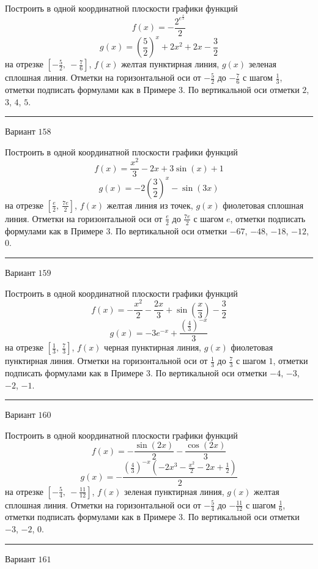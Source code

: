 \documentclass[11pt]{report}
\begin{document}
Построить в одной координатной плоскости графики функций $$f(x) = - \frac{2^{e^{\frac{x}{2}}}}{2}$$ $$g(x) = \left(\frac{5}{2}\right)^{x} + 2 x^{2} + 2 x - \frac{3}{2}$$ на отрезке $\left[- \frac{5}{2}, \  - \frac{7}{6}\right]$, $f(x)$ желтая пунктирная линия, $g(x)$ зеленая сплошная линия. Отметки на горизонтальной оси от $- \frac{5}{2}$ до $- \frac{7}{6}$ с шагом $\frac{1}{3}$, отметки подписать формулами как в Примере 3. По вертикальной оси отметки $2$, $3$, $4$, $5$.
\begin{center}
\noindent\rule{8cm}{0.4pt}
\end{center}
Вариант $158$


Построить в одной координатной плоскости графики функций $$f(x) = \frac{x^{2}}{3} - 2 x + 3 \sin{\left(x \right)} + 1$$ $$g(x) = - 2 \left(\frac{3}{2}\right)^{x} - \sin{\left(3 x \right)}$$ на отрезке $\left[\frac{e}{2}, \  \frac{7 e}{2}\right]$, $f(x)$ желтая линия из точек, $g(x)$ фиолетовая сплошная линия. Отметки на горизонтальной оси от $\frac{e}{2}$ до $\frac{7 e}{2}$ с шагом $e$, отметки подписать формулами как в Примере 3. По вертикальной оси отметки $-67$, $-48$, $-18$, $-12$, $0$.
\begin{center}
\noindent\rule{8cm}{0.4pt}
\end{center}
Вариант $159$


Построить в одной координатной плоскости графики функций $$f(x) = - \frac{x^{2}}{2} - \frac{2 x}{3} + \sin{\left(\frac{x}{3} \right)} - \frac{3}{2}$$ $$g(x) = - 3 e^{- x} + \frac{\left(\frac{4}{3}\right)^{- x}}{3}$$ на отрезке $\left[\frac{1}{3}, \  \frac{7}{3}\right]$, $f(x)$ черная пунктирная линия, $g(x)$ фиолетовая пунктирная линия. Отметки на горизонтальной оси от $\frac{1}{3}$ до $\frac{7}{3}$ с шагом $1$, отметки подписать формулами как в Примере 3. По вертикальной оси отметки $-4$, $-3$, $-2$, $-1$.
\begin{center}
\noindent\rule{8cm}{0.4pt}
\end{center}
Вариант $160$


Построить в одной координатной плоскости графики функций $$f(x) = - \frac{\sin{\left(2 x \right)}}{2} - \frac{\cos{\left(2 x \right)}}{3}$$ $$g(x) = - \frac{\left(\frac{4}{3}\right)^{- x} \left(- 2 x^{3} - \frac{x^{2}}{2} - 2 x + \frac{1}{2}\right)}{2}$$ на отрезке $\left[- \frac{5}{4}, \  - \frac{11}{12}\right]$, $f(x)$ зеленая пунктирная линия, $g(x)$ желтая сплошная линия. Отметки на горизонтальной оси от $- \frac{5}{4}$ до $- \frac{11}{12}$ с шагом $\frac{1}{6}$, отметки подписать формулами как в Примере 3. По вертикальной оси отметки $-3$, $-2$, $0$.
\begin{center}
\noindent\rule{8cm}{0.4pt}
\end{center}
Вариант $161$
\end{document}
